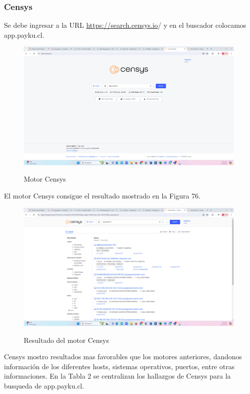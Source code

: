 \documentclass[stu, 11pt, letterpaper, donotrepeattitle, floatsintext, natbib]{apa7}
\begin{document}
\subsubsection{Censys}

Se debe ingresar a la URL \url{https://search.censys.io}/ y en el buscador colocamos app.payku.cl.

\begin{figure}[H]
    \centering
    \caption{Motor Censys}
    \includegraphics[width=0.75\linewidth]{ac66.png} %
    \label{fig:OverallEffect}
\end{figure}

El motor Censys consigue el resultado mostrado en la Figura 76.

\begin{figure}[H]
    \centering
    \caption{Resultado del motor Censys}
    \includegraphics[width=0.75\linewidth]{ac67.png} %
    \label{fig:OverallEffect}
\end{figure}

Censys mostro resultados mas favorables que los motores anteriores, dandonos información de los diferentes hosts, sistemas operativos, puertos, entre otras informaciones. En la Tabla 2 se centralizan los hallazgos de Censys para la busqueda de app.payku.cl.
\end{document}
